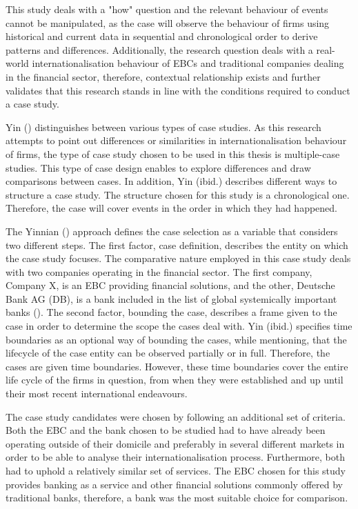 \documentclass[11pt,a4paper]{article}
\begin{document}
{{This study deals with a "how" question and the relevant behaviour of events cannot be manipulated, as the case will observe the behaviour of firms using historical and current data in sequential and chronological order to derive patterns and differences. Additionally, the research question deals with a real-world internationalisation behaviour of EBCs and traditional companies dealing in the financial sector, therefore, contextual relationship exists and further validates that this research stands in line with the conditions required to conduct a case study. \par
Yin (\citeyear{yinCaseStudyResearch2017}) distinguishes between various types of case studies. As this research attempts to point out differences or similarities in internationalisation behaviour of firms, the type of case study chosen to be used in this thesis is multiple-case studies. This type of case design enables to explore differences and draw comparisons between cases. In addition, Yin (ibid.) describes different ways to structure a case study. The structure chosen for this study is a chronological one. Therefore, the case will cover events in the order in which they had happened.  \par

The Yinnian (\citeyear{yinCaseStudyResearch2017}) approach defines the case selection as a variable that considers two different steps. The first factor, case definition, describes the entity on which the case study focuses. The comparative nature employed in this case study deals with two companies operating in the financial sector. The first company, Company X, is an EBC providing financial solutions, and the other, Deutsche Bank AG (DB), is a bank included in the list of global systemically important banks (\cite{2019ListGlobal2019}).  The second factor, bounding the case, describes a frame given to the case in order to determine the scope the cases deal with. Yin (ibid.) specifies time boundaries as an optional way of bounding the cases, while mentioning, that the lifecycle of the case entity can be observed partially or in full. Therefore, the cases are given time boundaries. However, these time boundaries cover the entire life cycle of the firms in question, from when they were established and up until their most recent international endeavours.   \par

The case study candidates were chosen by following an additional set of criteria. Both the EBC and the bank chosen to be studied had to have already been operating outside of their domicile and preferably in several different markets in order to be able to analyse their internationalisation process.  Furthermore, both had to uphold a relatively similar set of services. The EBC chosen for this study provides banking as a service and other financial solutions commonly offered by traditional banks, therefore, a bank was the most suitable choice for comparison. 

}}
\end{document}
